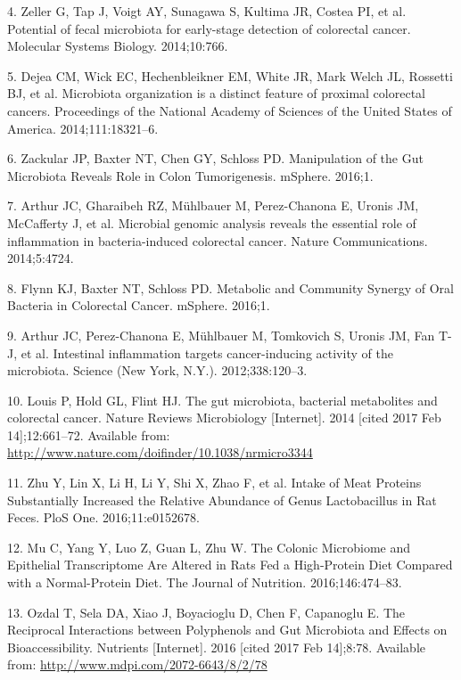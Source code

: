 \documentclass[12pt,]{article}
\begin{document}
\hypertarget{ref-zeller_potential_2014}{}
4. Zeller G, Tap J, Voigt AY, Sunagawa S, Kultima JR, Costea PI, et al.
Potential of fecal microbiota for early-stage detection of colorectal
cancer. Molecular Systems Biology. 2014;10:766.

\hypertarget{ref-dejea_microbiota_2014}{}
5. Dejea CM, Wick EC, Hechenbleikner EM, White JR, Mark Welch JL,
Rossetti BJ, et al. Microbiota organization is a distinct feature of
proximal colorectal cancers. Proceedings of the National Academy of
Sciences of the United States of America. 2014;111:18321--6.

\hypertarget{ref-zackular_manipulation_2016}{}
6. Zackular JP, Baxter NT, Chen GY, Schloss PD. Manipulation of the Gut
Microbiota Reveals Role in Colon Tumorigenesis. mSphere. 2016;1.

\hypertarget{ref-arthur_microbial_2014}{}
7. Arthur JC, Gharaibeh RZ, Mühlbauer M, Perez-Chanona E, Uronis JM,
McCafferty J, et al. Microbial genomic analysis reveals the essential
role of inflammation in bacteria-induced colorectal cancer. Nature
Communications. 2014;5:4724.

\hypertarget{ref-flynn_metabolic_2016}{}
8. Flynn KJ, Baxter NT, Schloss PD. Metabolic and Community Synergy of
Oral Bacteria in Colorectal Cancer. mSphere. 2016;1.

\hypertarget{ref-arthur_intestinal_2012}{}
9. Arthur JC, Perez-Chanona E, Mühlbauer M, Tomkovich S, Uronis JM, Fan
T-J, et al. Intestinal inflammation targets cancer-inducing activity of
the microbiota. Science (New York, N.Y.). 2012;338:120--3.

\hypertarget{ref-louis_gut_2014}{}
10. Louis P, Hold GL, Flint HJ. The gut microbiota, bacterial
metabolites and colorectal cancer. Nature Reviews Microbiology
{[}Internet{]}. 2014 {[}cited 2017 Feb 14{]};12:661--72. Available from:
\url{http://www.nature.com/doifinder/10.1038/nrmicro3344}

\hypertarget{ref-zhu_intake_2016}{}
11. Zhu Y, Lin X, Li H, Li Y, Shi X, Zhao F, et al. Intake of Meat
Proteins Substantially Increased the Relative Abundance of Genus
Lactobacillus in Rat Feces. PloS One. 2016;11:e0152678.

\hypertarget{ref-mu_colonic_2016}{}
12. Mu C, Yang Y, Luo Z, Guan L, Zhu W. The Colonic Microbiome and
Epithelial Transcriptome Are Altered in Rats Fed a High-Protein Diet
Compared with a Normal-Protein Diet. The Journal of Nutrition.
2016;146:474--83.

\hypertarget{ref-ozdal_reciprocal_2016}{}
13. Ozdal T, Sela DA, Xiao J, Boyacioglu D, Chen F, Capanoglu E. The
Reciprocal Interactions between Polyphenols and Gut Microbiota and
Effects on Bioaccessibility. Nutrients {[}Internet{]}. 2016 {[}cited
2017 Feb 14{]};8:78. Available from:
\url{http://www.mdpi.com/2072-6643/8/2/78}
\end{document}
